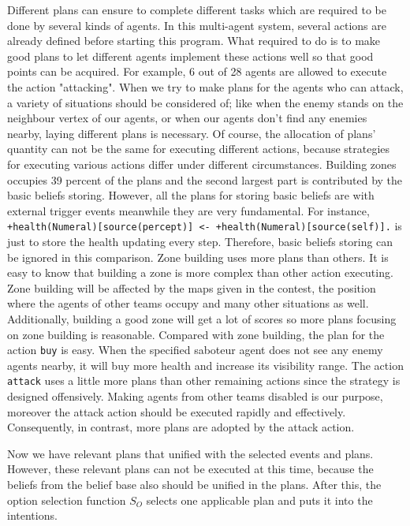 Different plans can ensure to complete different tasks which are required to be done by several kinds of agents. In this multi-agent system, several actions are already defined before starting this program. What required to do is to make good plans to let different agents implement these actions well so that good points can be acquired. For example, 6 out of 28 agents are allowed to execute the action "attacking". When we try to make plans for the agents who can attack, a variety of situations should be considered of; like when the enemy stands on the neighbour vertex of our agents, or when our agents don't find any enemies nearby, laying different plans is necessary. Of course, the allocation of plans' quantity can not be the same for executing different actions, because strategies for executing various actions differ under different circumstances. Building zones occupies 39 percent of the plans and the second largest part is contributed by the basic beliefs storing. However, all the plans for storing basic beliefs are with external trigger events meanwhile they are very fundamental. For instance, \texttt{+health(Numeral)[source(percept)] <- +health(Numeral)[source(self)].} is just to store the health updating every step.
Therefore, basic beliefs storing can be ignored in this comparison. Zone building uses more plans than others. It is easy to know that building a zone is more complex than other action executing. Zone building will be affected by the maps given in the contest, the position where the agents of other teams occupy and many other situations as well. Additionally, building a good zone will get a lot of scores so more plans focusing on zone building is reasonable. Compared with zone building, the plan for the action \texttt{buy} is easy. When the specified saboteur agent does not see any enemy agents nearby, it will buy more health and increase its visibility range.
The action \texttt{attack} uses a little more plans than other remaining actions since the strategy is designed offensively. Making agents from other teams disabled is our purpose, moreover the attack action should be executed rapidly and effectively. Consequently, in contrast, more plans are adopted by the attack action.

Now we have relevant plans that unified with the selected events and plans. However, these relevant plans can not be executed at this time, because the beliefs from the belief base also should be unified in the plans. After this, the option selection function $S_O$ selects one applicable plan and puts it into the intentions.

